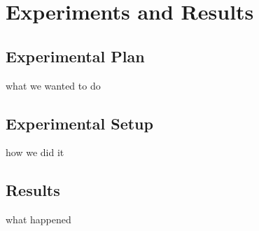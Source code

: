 \chapter{Experiments and Results}

\section{Experimental Plan}
what we wanted to do

\section{Experimental Setup}
how we did it

\section{Results}
what happened

\cleardoublepage